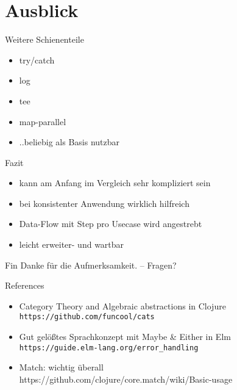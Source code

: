 \documentclass[compress]{beamer}
\begin{document}

\section{Ausblick}
\begin{frame}{Weitere Schienenteile}
  \begin{itemize}
    \item try/catch
    \item log
    \item tee
    \item map-parallel
    \item ..beliebig als Basis nutzbar
  \end{itemize}
\end{frame}
\begin{frame}{Fazit}
  \begin{itemize}
    \item kann am Anfang im Vergleich sehr kompliziert sein
    \item bei konsistenter Anwendung wirklich hilfreich
    \item Data-Flow mit Step pro Usecase wird angestrebt
    \item leicht erweiter- und wartbar
  \end{itemize}
\end{frame}

\begin{frame}{Fin}
  Danke für die Aufmerksamkeit. -- Fragen?
\end{frame}
\begin{frame}{References}
  \begin{itemize}
    \item Category Theory and Algebraic abstractions in Clojure
      \\
      \texttt{https://github.com/funcool/cats}
    \item Gut gelößtes Sprachkonzept mit Maybe \& Either in Elm
      \\
      \texttt{https://guide.elm-lang.org/error\_handling}
    \item Match: wichtig überall
      \\
      https://github.com/clojure/core.match/wiki/Basic-usage
  \end{itemize}
\end{frame}
\end{document}
